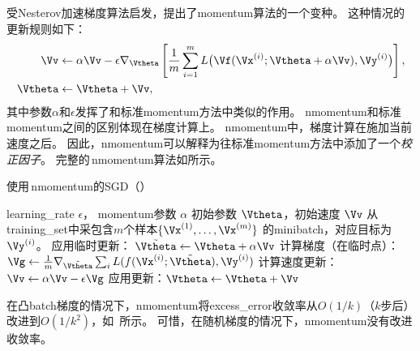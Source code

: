 \subsection{}
\label{sec:nesterov_momentum}
受Nesterov加速梯度算法\citep{Nesterov-1983,Nesterov-2004}启发，\cite{Sutskever-et-al-2013}提出了\gls{momentum}算法的一个变种。
这种情况的更新规则如下：
\begin{align}
    \Vv &\leftarrow \alpha\Vv - \epsilon \nabla_{\Vtheta} \left[
    \frac{1}{m} \sum_{i=1}^m L\big( \Vf(\Vx^{(i)}; \Vtheta + \alpha \Vv), \Vy^{(i)} \big)
 \right], \\
    \Vtheta &\leftarrow \Vtheta + \Vv ,
\end{align}
其中参数$\alpha$和$\epsilon$发挥了和标准\gls{momentum}方法中类似的作用。 
\gls{nmomentum}和标准\gls{momentum}之间的区别体现在梯度计算上。
\gls{nmomentum}中，梯度计算在施加当前速度之后。
因此，\gls{nmomentum}可以解释为往标准\gls{momentum}方法中添加了一个\emph{校正因子}。
完整的\,\gls{nmomentum}算法如所示。


\begin{algorithm}[ht]
\caption{使用\,\gls{nmomentum}的\gls{SGD}（）}
\label{alg:nesterov}
\begin{algorithmic}
\REQUIRE  \gls{learning_rate} $\epsilon$， \gls{momentum}参数 $\alpha$
\REQUIRE 初始参数 $\Vtheta$，初始速度 $\Vv$
    \STATE 从\gls{training_set}中采包含$m$个样本$\{ \Vx^{(1)},\dots, \Vx^{(m)}\}$ 的\gls{minibatch}，对应目标为$\Vy^{(i)}$。
    \STATE 应用临时更新： $\tilde{\Vtheta} \leftarrow \Vtheta  + \alpha \Vv$
         \STATE 计算梯度（在临时点）：$\Vg \leftarrow 
         \frac{1}{m} \nabla_{\tilde{\Vtheta}} \sum_i L(f(\Vx^{(i)};\tilde{\Vtheta}),\Vy^{(i)})$
    \STATE 计算速度更新：$\Vv \leftarrow \alpha \Vv - 
    \epsilon \Vg$
    \STATE 应用更新：$\Vtheta \leftarrow \Vtheta + \Vv$ 
\ENDWHILE
\end{algorithmic}
\end{algorithm}



在凸\gls{batch}梯度的情况下，\gls{nmomentum}将\gls{excess_error}收敛率从$O(1/k)$（$k$步后）改进到$O(1/k^2)$，如~\cite{Nesterov-1983}所示。
可惜，在随机梯度的情况下，\gls{nmomentum}没有改进收敛率。


